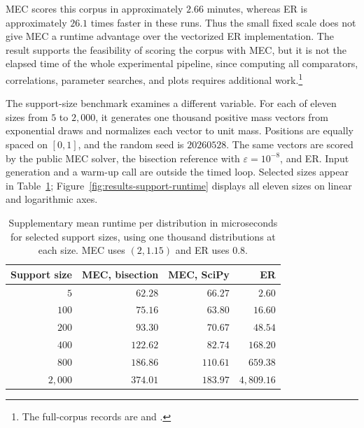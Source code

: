 \documentclass{article}
\theoremstyle{plain}
\theoremstyle{remark}
\begin{document}
MEC scores this corpus in approximately $2.66$ minutes, whereas ER is approximately $26.1$ times faster in these runs. Thus the small fixed scale does not give MEC a runtime advantage over the vectorized ER implementation. The result supports the feasibility of scoring the corpus with MEC, but it is not the elapsed time of the whole experimental pipeline, since computing all comparators, correlations, parameter searches, and plots requires additional work.\footnote{The full-corpus records are  and .}

The support-size benchmark examines a different variable. For each of eleven sizes from $5$ to $2{,}000$, it generates one thousand positive mass vectors from exponential draws and normalizes each vector to unit mass. Positions are equally spaced on $[0,1]$, and the random seed is $20260528$. The same vectors are scored by the public MEC solver, the bisection reference with $\varepsilon=10^{-8}$, and ER. Input generation and a warm-up call are outside the timed loop. Selected sizes appear in Table~\ref{tab:results-support-timing}; Figure~\ref{fig:results-support-runtime} displays all eleven sizes on linear and logarithmic axes.

\begin{table}[htbp]
\centering
\caption{Supplementary mean runtime per distribution in microseconds for selected support sizes, using one thousand distributions at each size. MEC uses $(2,1.15)$ and ER uses $0.8$.}
\label{tab:results-support-timing}
\small
\begin{tabular}{@{}rrrr@{}}
\toprule
Support size & MEC, bisection & MEC, SciPy & ER\\
\midrule
$5$      & $62.28$  & $66.27$  & $2.60$\\
$100$    & $75.16$  & $63.80$  & $16.60$\\
$200$    & $93.30$  & $70.67$  & $48.54$\\
$400$    & $122.62$ & $82.74$  & $168.20$\\
$800$    & $186.86$ & $110.61$ & $659.38$\\
$2{,}000$ & $374.01$ & $183.97$ & $4{,}809.16$\\
\bottomrule
\end{tabular}
\end{table}
\end{document}
